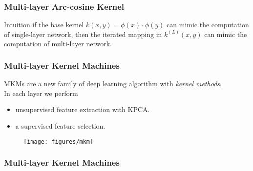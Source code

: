 \documentclass[a4paper,compress,svgnames]{beamer}
\begin{document}
\begin{frame}
\frametitle{Multi-layer Arc-cosine Kernel}
\begin{block}{Intuition}
if the base kernel $k(x,y) = \phi(x) \cdot \phi(y)$ can mimic the computation of single-layer network, then the iterated mapping in $k^{(L)}(x,y)$ can mimic the computation of multi-layer network.
\end{block}
\end{frame}

\begin{frame}
\frametitle{Multi-layer Kernel Machines}
MKMs are a new family of deep learning algorithm with \textit{kernel methods}.\\
In each layer we perform
\begin{itemize}
\item unsupervised feature extraction with KPCA.
\item a supervised feature selection.
\end{itemize}
\begin{figure}[h]
  \centering
  \captionsetup{justification=centering,margin=0.1cm}
  \texttt{[image: figures/mkm]}
\end{figure}
\end{frame}

\begin{frame}
\frametitle{Multi-layer Kernel Machines}
\renewcommand{\arraystretch}{1.9}
\begin{table}
\centering
{}
\caption{Experimental Results of MKMs with Arc-cosine Kernels}
\label{tab_results_mkm}
\end{table}
\renewcommand{\arraystretch}{1}
\end{frame}
\end{document}

